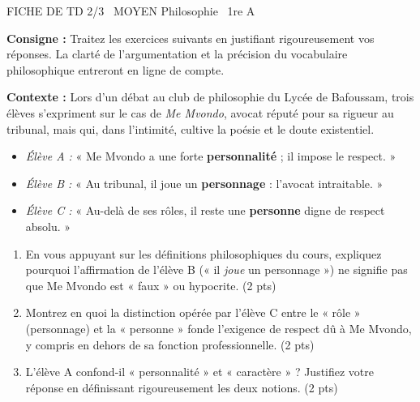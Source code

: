 \documentclass[11pt]{article}
\begin{document}
\begin{tcolorbox}[enhanced,colback=popink,colframe=popink,arc=10pt,boxrule=0pt,left=12pt,right=12pt,top=9pt,bottom=9pt]
{\color{white}\popxbold\small FICHE DE TD 2/3 \textbullet\ MOYEN \hfill Philosophie \textbullet\ 1re A\par}
\end{tcolorbox}
\vspace{4pt}

\noindent \textbf{Consigne :} Traitez les exercices suivants en justifiant rigoureusement vos réponses. La clarté de l'argumentation et la précision du vocabulaire philosophique entreront en ligne de compte.

\begin{exercice}
\textbf{Contexte :} Lors d'un débat au club de philosophie du Lycée de Bafoussam, trois élèves s'expriment sur le cas de \textit{Me Mvondo}, avocat réputé pour sa rigueur au tribunal, mais qui, dans l'intimité, cultive la poésie et le doute existentiel.
\begin{itemize}
    \item \textit{Élève A :} « Me Mvondo a une forte \textbf{personnalité} ; il impose le respect. »
    \item \textit{Élève B :} « Au tribunal, il joue un \textbf{personnage} : l'avocat intraitable. »
    \item \textit{Élève C :} « Au-delà de ses rôles, il reste une \textbf{personne} digne de respect absolu. »
\end{itemize}
\begin{enumerate}
    \item En vous appuyant sur les définitions philosophiques du cours, expliquez pourquoi l'affirmation de l'élève B (« il \textit{joue} un personnage ») ne signifie pas que Me Mvondo est « faux » ou hypocrite. (2 pts)
    \item Montrez en quoi la distinction opérée par l'élève C entre le « rôle » (personnage) et la « personne » fonde l'exigence de respect dû à Me Mvondo, y compris en dehors de sa fonction professionnelle. (2 pts)
    \item L'élève A confond-il « personnalité » et « caractère » ? Justifiez votre réponse en définissant rigoureusement les deux notions. (2 pts)
\end{enumerate}
\end{exercice}
\end{document}
